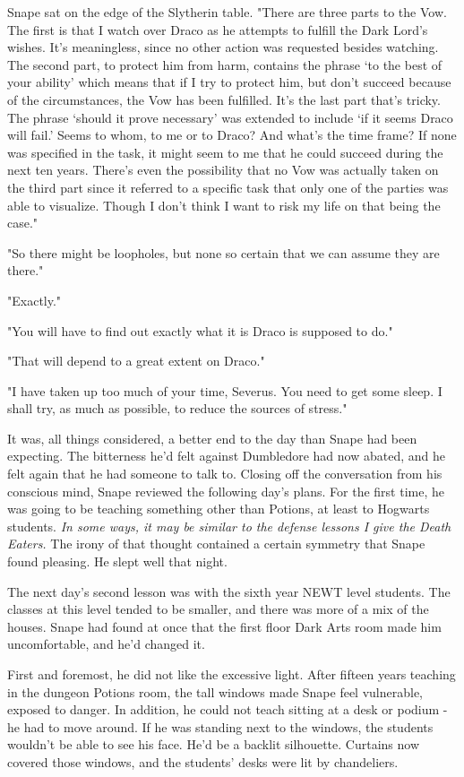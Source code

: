 Snape sat on the edge of the Slytherin table. "There are three parts to the Vow. The first is that I watch over Draco as he attempts to fulfill the Dark Lord's wishes. It's meaningless, since no other action was requested besides watching. The second part, to protect him from harm, contains the phrase `to the best of your ability' which means that if I try to protect him, but don't succeed because of the circumstances, the Vow has been fulfilled. It's the last part that's tricky. The phrase `should it prove necessary' was extended to include `if it seems Draco will fail.' Seems to whom, to me or to Draco? And what's the time frame? If none was specified in the task, it might seem to me that he could succeed during the next ten years. There's even the possibility that no Vow was actually taken on the third part since it referred to a specific task that only one of the parties was able to visualize. Though I don't think I want to risk my life on that being the case."

"So there might be loopholes, but none so certain that we can assume they are there."

"Exactly."

"You will have to find out exactly what it is Draco is supposed to do."

"That will depend to a great extent on Draco."

"I have taken up too much of your time, Severus. You need to get some sleep. I shall try, as much as possible, to reduce the sources of stress."

It was, all things considered, a better end to the day than Snape had been expecting. The bitterness he'd felt against Dumbledore had now abated, and he felt again that he had someone to talk to. Closing off the conversation from his conscious mind, Snape reviewed the following day's plans. For the first time, he was going to be teaching something other than Potions, at least to Hogwarts students. \emph{In some ways, it may be similar to the defense lessons I give the Death Eaters.} The irony of that thought contained a certain symmetry that Snape found pleasing. He slept well that night.

The next day's second lesson was with the sixth year NEWT level students. The classes at this level tended to be smaller, and there was more of a mix of the houses. Snape had found at once that the first floor Dark Arts room made him uncomfortable, and he'd changed it.

First and foremost, he did not like the excessive light. After fifteen years teaching in the dungeon Potions room, the tall windows made Snape feel vulnerable, exposed to danger. In addition, he could not teach sitting at a desk or podium - he had to move around. If he was standing next to the windows, the students wouldn't be able to see his face. He'd be a backlit silhouette. Curtains now covered those windows, and the students' desks were lit by chandeliers.

